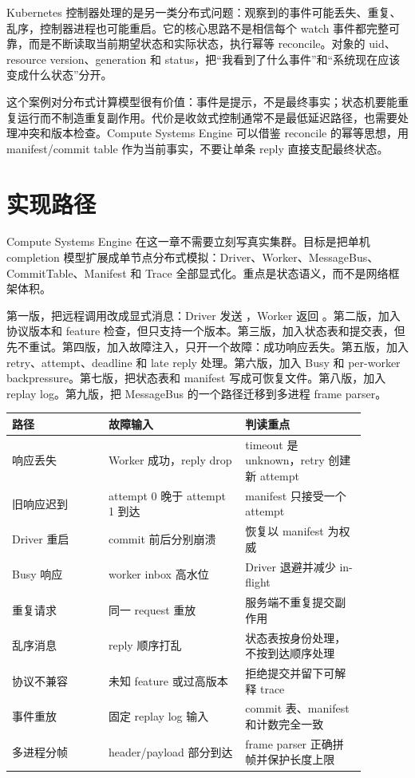 \begin{casebox}
Kubernetes 控制器处理的是另一类分布式问题：观察到的事件可能丢失、重复、乱序，控制器进程也可能重启。它的核心思路不是相信每个 watch 事件都完整可靠，而是不断读取当前期望状态和实际状态，执行幂等 reconcile。对象的 uid、resource version、generation 和 status，把“我看到了什么事件”和“系统现在应该变成什么状态”分开。

这个案例对分布式计算模型很有价值：事件是提示，不是最终事实；状态机要能重复运行而不制造重复副作用。代价是收敛式控制通常不是最低延迟路径，也需要处理冲突和版本检查。Compute Systems Engine 可以借鉴 reconcile 的幂等思想，用 manifest/commit table 作为当前事实，不要让单条 reply 直接支配最终状态。
\end{casebox}

\section{实现路径}

Compute Systems Engine 在这一章不需要立刻写真实集群。目标是把单机 completion 模型扩展成单节点分布式模拟：Driver、Worker、MessageBus、CommitTable、Manifest 和 Trace 全部显式化。重点是状态语义，而不是网络框架体积。

第一版，把远程调用改成显式消息：Driver 发送 ，Worker 返回 。第二版，加入协议版本和 feature 检查，但只支持一个版本。第三版，加入状态表和提交表，但先不重试。第四版，加入故障注入，只开一个故障：成功响应丢失。第五版，加入 retry、attempt、deadline 和 late reply 处理。第六版，加入 Busy 和 per-worker backpressure。第七版，把状态表和 manifest 写成可恢复文件。第八版，加入 replay log。第九版，把 MessageBus 的一个路径迁移到多进程 frame parser。

\begin{center}
\begin{tabular}{p{0.24\linewidth}p{0.34\linewidth}p{0.30\linewidth}}
\toprule
路径 & 故障输入 & 判读重点 \\
\midrule
响应丢失 & Worker 成功，reply drop & timeout 是 unknown，retry 创建新 attempt \\
旧响应迟到 & attempt 0 晚于 attempt 1 到达 & manifest 只接受一个 attempt \\
Driver 重启 & commit 前后分别崩溃 & 恢复以 manifest 为权威 \\
Busy 响应 & worker inbox 高水位 & Driver 退避并减少 in-flight \\
重复请求 & 同一 request 重放 & 服务端不重复提交副作用 \\
乱序消息 & reply 顺序打乱 & 状态表按身份处理，不按到达顺序处理 \\
协议不兼容 & 未知 feature 或过高版本 & 拒绝提交并留下可解释 trace \\
事件重放 & 固定 replay log 输入 & commit 表、manifest 和计数完全一致 \\
多进程分帧 & header/payload 部分到达 & frame parser 正确拼帧并保护长度上限 \\
\bottomrule
\end{tabular}
\end{center}

